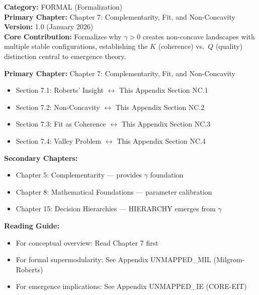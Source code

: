 
\begin{tcolorbox}[colback=blue!5!white, colframe=blue!75!black,
    title=\textbf{Appendix: NC (FORMAL-NC)}]
\textbf{Category:} FORMAL (Formalization) \\
\textbf{Primary Chapter:} Chapter 7: Complementarity, Fit, and Non-Concavity \\
\textbf{Version:} 1.0 (January 2026) \\
\textbf{Core Contribution:} Formalizes why $\gamma > 0$ creates non-concave landscapes with multiple stable configurations, establishing the $K$ (coherence) vs.\ $Q$ (quality) distinction central to emergence theory.
\end{tcolorbox}


\begin{tcolorbox}[colback=purple!5!white, colframe=purple!75!black,
    title=Chapter Linkage]

\textbf{Primary Chapter:} Chapter 7: Complementarity, Fit, and Non-Concavity
\begin{itemize}[nosep]
\item Section 7.1: Roberts' Insight $\leftrightarrow$ This Appendix Section NC.1
\item Section 7.2: Non-Concavity $\leftrightarrow$ This Appendix Section NC.2
\item Section 7.3: Fit as Coherence $\leftrightarrow$ This Appendix Section NC.3
\item Section 7.4: Valley Problem $\leftrightarrow$ This Appendix Section NC.4
\end{itemize}

\textbf{Secondary Chapters:}
\begin{itemize}[nosep]
\item Chapter 5: Complementarity --- provides $\gamma$ foundation
\item Chapter 8: Mathematical Foundations --- parameter calibration
\item Chapter 15: Decision Hierarchies --- HIERARCHY emerges from $\gamma$
\end{itemize}

\textbf{Reading Guide:}
\begin{itemize}[nosep]
\item For conceptual overview: Read Chapter 7 first
\item For formal supermodularity: See Appendix UNMAPPED_MIL (Milgrom-Roberts)
\item For emergence implications: See Appendix UNMAPPED_IE (CORE-EIT)
\end{itemize}

\end{tcolorbox}

